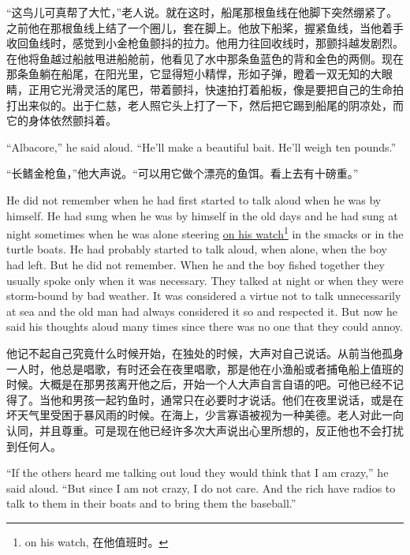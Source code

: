 \begin{paracol}{2}
\switchcolumn

“这鸟儿可真帮了大忙，”老人说。就在这时，船尾那根鱼线在他脚下突然绷紧了。之前他在那根鱼线上结了一个圈儿，套在脚上。他放下船桨，握紧鱼线，当他着手收回鱼线时，感觉到小金枪鱼颤抖的拉力。他用力往回收线时，那颤抖越发剧烈。在他将鱼越过船舷甩进船舱前，他看见了水中那条鱼蓝色的背和金色的两侧。现在那条鱼躺在船尾，在阳光里，它显得短小精悍，形如子弹，瞪着一双无知的大眼睛，正用它光滑灵活的尾巴，带着颤抖，快速拍打着船板，像是要把自己的生命拍打出来似的。出于仁慈，老人照它头上打了一下，然后把它踢到船尾的阴凉处，而它的身体依然颤抖着。

\switchcolumn*

``Albacore,'' he said aloud. ``He'll make a beautiful bait. He'll weigh ten pounds.''

\switchcolumn

“长鳍金枪鱼，”他大声说。“可以用它做个漂亮的鱼饵。看上去有十磅重。”

\switchcolumn*

He did not remember when he had first started to talk aloud when he was by
himself. He had \gls{sung} when he was by himself in the old days and he had
sung at night sometimes when he was alone steering \uline{on his
  watch}\footnote{on his watch, 在他值班时。} in the \glspl{smack} or in the
turtle boats. He had probably started to talk aloud, when alone, when the
boy had left. But he did not remember. When he and the boy fished together
they usually spoke only when it was necessary. They talked at night or when
they were \gls{storm-bound} by bad weather. It was \gls{considered} a
\gls{virtue} not to talk unnecessarily at sea and the old man had always
considered it so and respected it. But now he said his thoughts \gls{aloud}
many times since there was no one that they could \gls{annoy}.

\switchcolumn

他记不起自己究竟什么时候开始，在独处的时候，大声对自己说话。从前当他孤身一人时，他总是唱歌，有时还会在夜里唱歌，那是他在小渔船或者捕龟船上值班的时候。大概是在那男孩离开他之后，开始一个人大声自言自语的吧。可他已经不记得了。当他和男孩一起钓鱼时，通常只在必要时才说话。他们在夜里说话，或是在坏天气里受困于暴风雨的时候。在海上，少言寡语被视为一种美德。老人对此一向认同，并且尊重。可是现在他已经许多次大声说出心里所想的，反正他也不会打扰到任何人。

\switchcolumn*

``If the others heard me talking out loud they would think that I am
crazy,'' he said aloud. ``But since I am not crazy, I do not care. And the
rich have radios to talk to them in their boats and to bring them the
baseball.''


\end{paracol}
